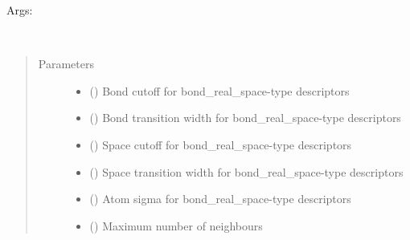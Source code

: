 \documentclass[letterpaper,10pt,english]{sphinxmanual}
\begin{document}

\begin{fulllineitems}
\label{\detokenize{descriptors:gap.descriptors.bispectrum_so4}}
Args:

\end{fulllineitems}


\begin{fulllineitems}
\label{\detokenize{descriptors:gap.descriptors.bond_real_space}}~\begin{quote}\begin{description}
\item[{Parameters}] \leavevmode\begin{itemize}
\item {} 
 () \textendash{} Bond cutoff for bond\_real\_space-type descriptors

\item {} 
 () \textendash{} Bond transition width for bond\_real\_space-type descriptors

\item {} 
 () \textendash{} Space cutoff for bond\_real\_space-type descriptors

\item {} 
 () \textendash{} Space transition width for bond\_real\_space-type descriptors

\item {} 
 () \textendash{} Atom sigma for bond\_real\_space-type descriptors

\item {} 
 () \textendash{} Maximum number of neighbours

\end{itemize}

\end{description}\end{quote}

\end{fulllineitems}
\end{document}
